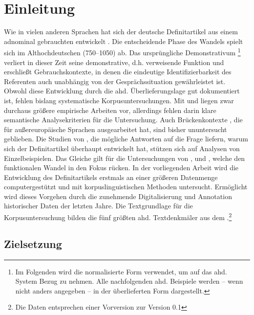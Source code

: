 \chapter{Einleitung}

Wie in vielen anderen Sprachen hat sich der deutsche Definitartikel aus einem adnominal gebrauchten  entwickelt  \parencite{Oubouzar1992,Szczepaniak2011a}. Die entscheidende Phase des Wandels spielt sich im Althochdeutschen (750--1050) ab. Das ursprüngliche Demonstrativum \footnote{Im Folgenden wird die normalisierte Form  verwendet, um auf das ahd. System Bezug zu nehmen. Alle nachfolgenden ahd. Beispiele werden -- wenn nicht anders angegeben -- in der überlieferten Form dargestellt.} verliert in dieser Zeit seine demonstrative, d.h. verweisende Funktion und erschließt Gebrauchskontexte, in denen die eindeutige Identifizierbarkeit des Referenten auch unabhängig von der Gesprächssituation gewährleistet ist. Obwohl diese Entwicklung durch die ahd. Überlieferungslage gut dokumentiert ist, fehlen bislang systematische Korpusuntersuchungen. Mit \textcite{Hodler1954} und \textcite{Oubouzar1989,Oubouzar1992,Oubouzar1997a} liegen zwar durchaus größere empirische Arbeiten vor, allerdings fehlen darin klare semantische Analysekriterien für die Untersuchung. Auch Brückenkontexte \parencite{Heine2002a}, die \textcite{Himmelmann1997} für außereuropäische Sprachen ausgearbeitet hat, sind bisher ununtersucht geblieben. Die Studien von \textcite{Abraham1997,Philippi1997,Leiss2000}, die mögliche Antworten auf die Frage liefern, warum sich der Definitartikel überhaupt entwickelt hat, stützen sich auf Analysen von Einzelbeispielen. Das Gleiche gilt für die Untersuchungen von \textcite{Demske2001}, \textcite{Kraiss2012,Kraiss2014} und \textcite{Schlachter2015}, welche den funktionalen Wandel in den Fokus rücken.
In der vorliegenden Arbeit wird die Entwicklung des Definitartikels erstmals an einer größeren Datenmenge computergestützt und mit korpuslinguistischen Methoden untersucht. Ermöglicht wird dieses Vorgehen durch die zunehmende Digitalisierung und Annotation historischer Daten der letzten Jahre. Die Textgrundlage für die Korpusuntersuchung bilden die fünf größten ahd. Textdenkmäler aus dem   \parencite{Donhauser2014}.\footnote{Die Daten entsprechen einer Vorversion zur Version 0.1}

\section{Zielsetzung} 

